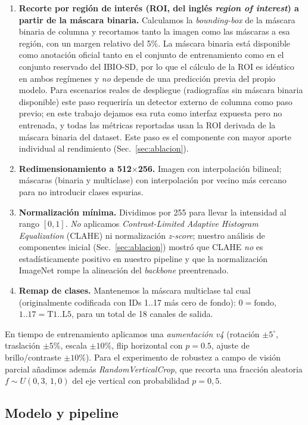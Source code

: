 \documentclass[conference]{IEEEtran}
\begin{document}
\begin{enumerate}
  \item \textbf{Recorte por región de interés (ROI, del inglés \emph{region of interest}) a partir de la máscara binaria.} Calculamos la \emph{bounding-box} de la máscara binaria de columna y recortamos tanto la imagen como las máscaras a esa región, con un margen relativo del 5\%. La máscara binaria está disponible como anotación oficial tanto en el conjunto de entrenamiento como en el conjunto reservado del IBIO-SD, por lo que el cálculo de la ROI es idéntico en ambos regímenes y \emph{no} depende de una predicción previa del propio modelo. Para escenarios reales de despliegue (radiografías sin máscara binaria disponible) este paso requeriría un detector externo de columna como paso previo; en este trabajo dejamos esa ruta como interfaz expuesta pero no entrenada, y todas las métricas reportadas usan la ROI derivada de la máscara binaria del dataset. Este paso es el componente con mayor aporte individual al rendimiento (Sec.~\ref{sec:ablacion}).
  \item \textbf{Redimensionamiento a 512$\times$256.} Imagen con interpolación bilineal; máscaras (binaria y multiclase) con interpolación por vecino más cercano para no introducir clases espurias.
  \item \textbf{Normalización mínima.} Dividimos por 255 para llevar la intensidad al rango $[0,1]$. \emph{No} aplicamos \emph{Contrast-Limited Adaptive Histogram Equalization} (CLAHE) ni normalización \emph{z-score}; nuestro análisis de componentes inicial (Sec.~\ref{sec:ablacion}) mostró que CLAHE \emph{no} es estadísticamente positivo en nuestro pipeline y que la normalización ImageNet rompe la alineación del \emph{backbone} preentrenado.
  \item \textbf{Remap de clases.} Mantenemos la máscara multiclase tal cual (originalmente codificada con IDs 1..17 más cero de fondo): $0 = \text{fondo}$, $1..17 = \text{T1..L5}$, para un total de 18 canales de salida.
\end{enumerate}

En tiempo de entrenamiento aplicamos una \emph{aumentación} \emph{v4} (rotación $\pm 5^{\circ}$, traslación $\pm 5\%$, escala $\pm 10\%$, flip horizontal con $p=0.5$, ajuste de brillo/contraste $\pm 10\%$). Para el experimento de robustez a campo de visión parcial añadimos además \emph{RandomVerticalCrop}, que recorta una fracción aleatoria $f \sim U(0{,}3,\,1{,}0)$ del eje vertical con probabilidad $p=0{,}5$.

\subsection{Modelo y pipeline}
\label{sec:modelo}
\end{document}
